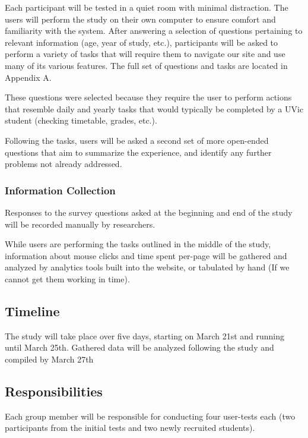 \documentclass{article}
\begin{document}
Each participant will be tested in a quiet room with minimal distraction. The users will perform the study on their own computer to ensure comfort and familiarity with the system. After answering a selection of questions pertaining to relevant information (age, year of study, etc.), participants will be asked to perform a variety of tasks that will require them to navigate our site and use many of its various features. The full set of questions and tasks are located in Appendix A.

These questions were selected because they require the user to perform actions that resemble daily and yearly tasks that would typically be completed by a UVic student (checking timetable, grades, etc.).

Following the tasks, users will be asked a second set of more open-ended questions that aim to summarize the experience, and identify any further problems not already addressed.

\subsubsection{Information Collection}

Responses to the survey questions asked at the beginning and end of the study will be recorded manually by researchers.

While users are performing the tasks outlined in the middle of the study, information about mouse clicks and time spent per-page will be gathered and analyzed by analytics tools built into the website, or tabulated by hand (If we cannot get them working in time).

\subsection{Timeline}

The study will take place over five days, starting on March 21st and running until March 25th. Gathered data will be analyzed following the study and compiled by March 27th

\subsection{Responsibilities}

Each group member will be responsible for conducting four user-tests each (two participants from the initial tests and two newly recruited students).




%
%
%
\end{document}
